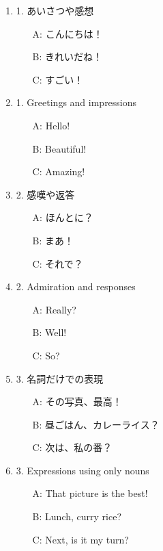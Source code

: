 \documentclass[uplatex,dvipdfmx,b5paper,english,10pt]{jsbook}
\begin{document}
\begin{enumerate}

  \ifJapanese
  \item 1. あいさつや感想
    \begin{itemize}
      \item[A:] こんにちは！
      \item[B:] きれいだね！
      \item[C:] すごい！
    \end{itemize}
  \else
  \item 1. Greetings and impressions
    \begin{itemize}
      \item[A:] Hello!
      \item[B:] Beautiful!
      \item[C:] Amazing!
    \end{itemize}
  \fi

  \ifJapanese
  \item 2. 感嘆や返答
    \begin{itemize}
      \item[A:] ほんとに？
      \item[B:] まあ！
      \item[C:] それで？
    \end{itemize}
 \else
  \item 2. Admiration and responses
    \begin{itemize}
      \item[A:] Really?
      \item[B:] Well!
      \item[C:] So?
    \end{itemize}
  \fi

  \ifJapanese
  \item 3. 名詞だけでの表現
    \begin{itemize}
      \item[A:] その写真、最高！
      \item[B:] 昼ごはん、カレーライス？
      \item[C:] 次は、私の番？
    \end{itemize}
 \else
  \item 3. Expressions using only nouns
    \begin{itemize}
      \item[A:] That picture is the best!
      \item[B:] Lunch, curry rice?
      \item[C:] Next, is it my turn?
    \end{itemize}
  \fi


\end{enumerate}
\end{document}
